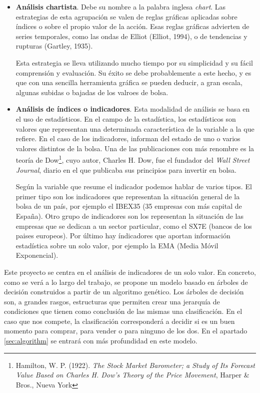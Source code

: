 \begin{itemize}
    \item \textbf{An\'alisis chartista}. Debe su nombre a la palabra inglesa \textit{chart}. Las estrategias de esta agrupaci\'on se valen de reglas gr\'aficas aplicadas sobre \'indices o sobre el propio valor de la acci\'on. Esas reglas gr\'aficas advierten de series temporales, como las ondas de Elliot (Elliot, 1994), o de tendencias y rupturas (Gartley, 1935). 
    
    Esta estrategia se lleva utilizando mucho tiempo por su simplicidad y su f\'acil comprensi\'on y evaluaci\'on.
    Su \'exito se debe probablemente a este hecho, y es que con una sencilla herramienta gr\'afica se pueden deducir, a gran escala, algunas subidas o bajadas de los valroes de bolsa.
    
    \item \textbf{An\'alisis de \'indices o indicadores}. Esta modalidad de an\'alisis se basa en el uso de estad\'isticos. En el campo de la estad\'istica, los estad\'isticos son valores que representan una determinada caracter\'istica de la variable a la que refiere. En el caso de los indicadores, informan del estado de uno o varios valores distintos de la bolsa. Una de las publicaciones con m\'as renombre es la teor\'ia de Dow\footnote{Hamilton, W. P. (1922). \textit{The Stock Market Barometer; a Study of Its Forecast Value Based on Charles H. Dow's Theory of the Price Movement}, Harper \& Bros., Nueva York}, cuyo autor, Charles H. Dow, fue el fundador del \textit{Wall Street Journal}, diario en el que publicaba sus principios para invertir en bolsa. 
    
    Seg\'un la variable que resume el indicador podemos hablar de varios tipos. El primer tipo son los indicadores que representan la situaci\'on general de la bolsa de un pa\'is, por ejemplo el IBEX35 (35 empresas con m\'as capital de Espa\~na). Otro grupo de indicadores son los representan la situaci\'on de las empresas que se dedican a un sector particular, como el  SX7E (bancos de los paises europeos).
    Por \'ultimo hay \'indicadores que aportan informaci\'on estad\'istica sobre un solo valor, por ejemplo la EMA (Media M\'ovil Exponencial).
\end{itemize}

Este proyecto se centra en el an\'alisis de indicadores de un solo valor. En concreto, como se ver\'a a lo largo del trabajo, se propone un modelo basado en \'arboles de decisi\'on construidos a partir de un algoritmo gen\'etico. Los \'arboles de decisi\'on son, a grandes rasgos, estructuras que permiten crear una jerarqu\'ia de condiciones que tienen como conclusi\'on de las mismas una clasificaci\'on. En el caso que nos compete, la clasificaci\'on corresponder\'a a decidir si es un buen momento para comprar, para vender o para ninguno de los dos. En el apartado \ref{sec:algorithm} se entrar\'a con m\'as profundidad en este modelo. 



